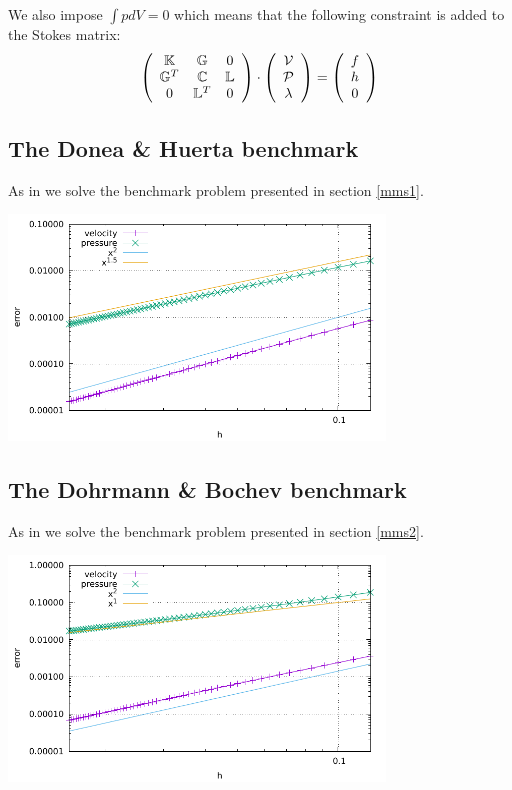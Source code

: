 We also impose $\int p dV=0$ which means that the following constraint is added 
to the Stokes matrix:
\[
\left(
\begin{array}{ccc}
{\mathbb{K}} & {\mathbb{G}} & 0\\ 
{\mathbb{G}}^T & {\mathbb{C}} & {\mathbb{L}} \\
0 & {\mathbb{L}}^T & 0 
\end{array}
\right)
\cdot
\left(
\begin{array}{c}
{\cal V} \\ {\cal P} \\ \lambda
\end{array}
\right)
=
\left(
\begin{array}{c}
 f \\ h \\ 0
\end{array}
\right)
\]

\subsection{The Donea \& Huerta benchmark}

As in \cite{dohu03} we solve the benchmark problem presented in section \ref{mms1}.

\includegraphics[width=10cm]{python_codes/fieldstone_22/results/case1/errors.pdf}

\subsection{The Dohrmann \& Bochev benchmark} 

As in \cite{dobo04} we solve the benchmark problem presented in section \ref{mms2}.

\includegraphics[width=10cm]{python_codes/fieldstone_22/results/case2/errors.pdf}

